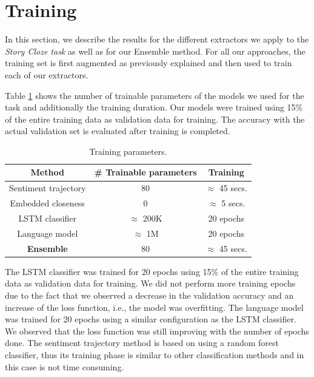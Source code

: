 \documentclass{article}
\newcommand{\lstm}{LSTM }
\begin{document}
\section{Training}
\label{sec:training}

In this section, we describe the results for the different extractors we apply
to the {\it Story Cloze task} as well as for our Ensemble method. For all our
approaches, the training set is first augmented as previously explained and then
used to train each of our extractors.

Table \ref{tab:params} shows the number of trainable parameters of the models we
used for the task and additionally the training duration. Our models were
trained using 15\% of the entire training data as validation data for training.
The accuracy with the actual validation set is evaluated after training is
completed. 

\begin{table}
    \caption{Training parameters.}
    \begin{center}
        \label{tab:params}
        \begin{tabular}{||c c c||} 
            \hline
            Method                 & \# Trainable parameters   & Training \\ [0.5ex] 
            \hline\hline
            Sentiment trajectory   & 80                        & $ \approx $ 45 secs. \\ 
            \hline
            Embedded closeness     & 0                         & $ \approx $ 5 secs.  \\
            \hline
            LSTM classifier        & $ \approx $ 200K          & 20 epochs \\ %
            \hline
            Language model         & $ \approx $ 1M            & 20 epochs \\ %
            \hline
            \textbf{Ensemble}      & 80                        & $ \approx $ 45 secs.  \\ [1ex] 
            \hline
        \end{tabular}
    \end{center}
\end{table}

The \lstm classifier was trained for 20 epochs using 15\% of the entire training
data as validation data for training. We did not perform more training epochs
due to the fact that we observed a decrease in the validation accuracy and an
increase of the loss function, i.e., the model was overfitting.  The language
model was trained for 20 epochs using a similar configuration as the \lstm
classifier. We observed that the loss function was still improving with the
number of epochs done. The sentiment trajectory method is based on using a
random forest classifier, thus its training phase is similar to other
classification methods and in this case is not time consuming.
\end{document}

